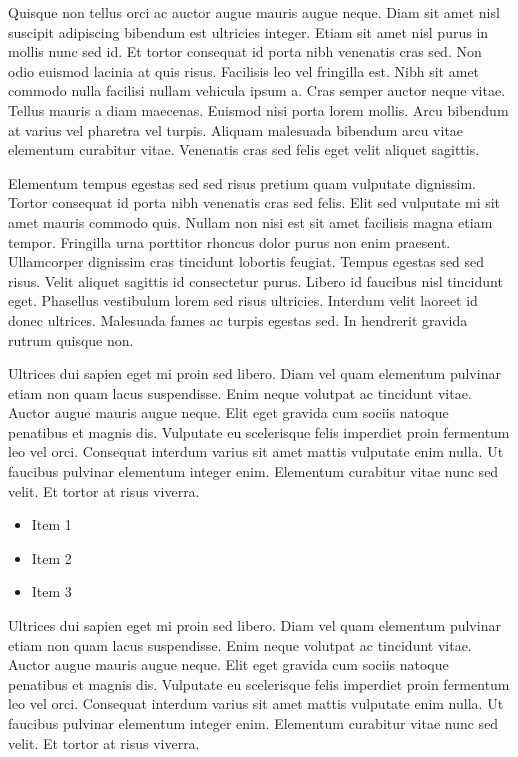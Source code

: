 \documentclass[10pt]{article} %
\newenvironment{BoxedInternal}[1][]
{%
  \begin{changemargin}{0cm}{0cm}%
    \begin{mdframed}[roundcorner=5pt,backgroundcolor=swred,outermargin  =-0.5in,innermargin =-0.5in, topline=false, bottomline=false, rightline=false, leftline=false,#1]
    }{%
    \end{mdframed}%
  \end{changemargin}%
}
\newcommand*{\noind}{\setlength{\parindent}{0cm}} %
\newcommand{\bighdr}[2][]{%
\vspace{2pt}
  \begin{BoxedInternal}[#1]{}
    \color{white}\huge\bfseries\headingfont\filcenter{#2}
  \end{BoxedInternal}\vspace{-8pt}%
}
\begin{document}
\begin{multicols}{2}
Quisque non tellus orci ac auctor augue mauris augue neque. Diam sit amet nisl suscipit adipiscing bibendum est ultricies integer. Etiam sit amet nisl purus in mollis nunc sed id. Et tortor consequat id porta nibh venenatis cras sed. Non odio euismod lacinia at quis risus. Facilisis leo vel fringilla est. Nibh sit amet commodo nulla facilisi nullam vehicula ipsum a. Cras semper auctor neque vitae. Tellus mauris a diam maecenas. Euismod nisi porta lorem mollis. Arcu bibendum at varius vel pharetra vel turpis. Aliquam malesuada bibendum arcu vitae elementum curabitur vitae. Venenatis cras sed felis eget velit aliquet sagittis.

\bighdr{OTHER STUFF}
{\noind
Elementum tempus egestas sed sed risus pretium quam vulputate dignissim. Tortor consequat id porta nibh venenatis cras sed felis. Elit sed vulputate mi sit amet mauris commodo quis. Nullam non nisi est sit amet facilisis magna etiam tempor. Fringilla urna porttitor rhoncus dolor purus non enim praesent. Ullamcorper dignissim cras tincidunt lobortis feugiat. Tempus egestas sed sed risus. Velit aliquet sagittis id consectetur purus. Libero id faucibus nisl tincidunt eget. Phasellus vestibulum lorem sed risus ultricies. Interdum velit laoreet id donec ultrices. Malesuada fames ac turpis egestas sed. In hendrerit gravida rutrum quisque non.
}

Ultrices dui sapien eget mi proin sed libero. Diam vel quam elementum pulvinar etiam non quam lacus suspendisse. Enim neque volutpat ac tincidunt vitae. Auctor augue mauris augue neque. Elit eget gravida cum sociis natoque penatibus et magnis dis. Vulputate eu scelerisque felis imperdiet proin fermentum leo vel orci. Consequat interdum varius sit amet mattis vulputate enim nulla. Ut faucibus pulvinar elementum integer enim. Elementum curabitur vitae nunc sed velit. Et tortor at risus viverra.

\begin{itemize} %
\item Item 1
\item Item 2
\item Item 3
\end{itemize}

Ultrices dui sapien eget mi proin sed libero. Diam vel quam elementum pulvinar etiam non quam lacus suspendisse. Enim neque volutpat ac tincidunt vitae. Auctor augue mauris augue neque. Elit eget gravida cum sociis natoque penatibus et magnis dis. Vulputate eu scelerisque felis imperdiet proin fermentum leo vel orci. Consequat interdum varius sit amet mattis vulputate enim nulla. Ut faucibus pulvinar elementum integer enim. Elementum curabitur vitae nunc sed velit. Et tortor at risus viverra.


\end{multicols}
\end{document}
